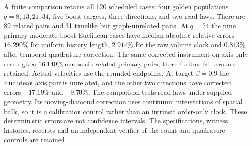 A finite comparison retains all 120 scheduled cases: four golden
populations $q=8,13,21,34$, five boost targets, three directions, and two
read laws. There are 89 related pairs and 31 timelike but graph-unrelated
pairs. At $q=34$ the nine primary moderate-boost Euclidean cases have median
absolute relative errors $16.290\%$ for uniform history length,
$2.914\%$ for the raw volume clock and $0.813\%$ after temporal quadrature
correction. The same corrected instrument on axis-only reads gives
$16.149\%$ across six related primary pairs; three further failures are
retained. Actual velocities use the rounded endpoints. At target
$\beta=0.9$ the Euclidean axis pair is unrelated, and the other two
directions have corrected errors $-17.19\%$ and $-9.70\%$.
The comparison tests read laws under supplied geometry. Its moving-diamond
correction uses continuum intersections of spatial balls, so it is a
calibration control rather than an intrinsic order-only clock. These
deterministic errors are not confidence intervals. The specifications,
witness histories, receipts and an independent verifier of the count and
quadrature controls are retained~\cite{ophrepo}.
